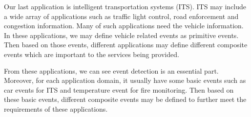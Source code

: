 Our last application is intelligent transportation systems (ITS). ITS may include a wide array of applications such as traffic light control, road enforcement and congestion information. Many of such applications need the vehicle information. In these applications, we may define vehicle related events as primitive events. Then based on those events, different applications may define different composite events which are important to the services being provided.

From these applications, we can see event detection is an essential part. Moreover, for each application domain, it usually have some basic events such as car events for ITS and temperature event for fire monitoring. Then based on these basic events, different composite events may be defined to further meet the requirements of these applications.
